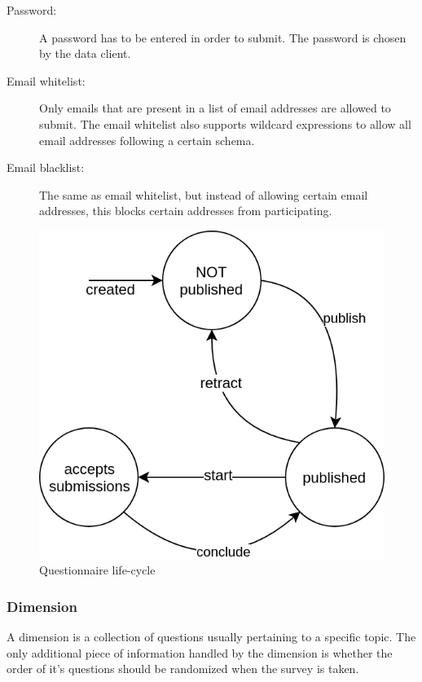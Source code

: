 \documentclass[a4paper,11pt]{article}
\begin{document}
                    \begin{description}
                        \item[Password:] A password has to be entered in order to submit.
                        The password is chosen by the data client.
                        \item[Email whitelist:] Only emails that are present in a list
                        of email addresses are allowed to submit. The email whitelist
                        also supports wildcard expressions to allow all email addresses
                        following a certain schema.
                        \item[Email blacklist:] The same as email whitelist, but instead
                        of allowing certain email addresses, this blocks certain addresses
                        from participating.
                    \end{description}

                    \begin{figure}
                        \centering
                        \includegraphics[width=.4\textwidth]{survey_lifecycle}
                        \caption{Questionnaire life-cycle}
                        \label{fig:survey-lifecycle}
                    \end{figure}
                    
                \subsubsection{Dimension}
                    A dimension is a collection of questions usually pertaining to
                    a specific topic. The only additional piece of information
                    handled by the dimension is whether the order of it's questions
                    should be randomized when the survey is taken.
\end{document}
